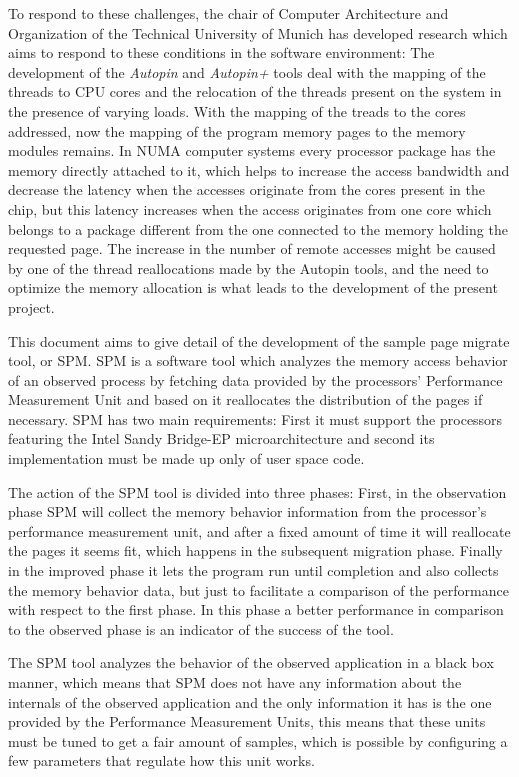 To respond to these challenges, the chair of Computer Architecture and Organization of the Technical University of Munich has developed research which aims to respond to these conditions in the software environment: The development of the \textit{Autopin} and \textit{Autopin+} tools deal with the mapping of the threads to CPU cores and the relocation of the threads present on the system in the presence of varying loads. 
With the mapping of the treads to the cores addressed, now the mapping of the program memory pages to the memory modules remains. In NUMA computer systems every processor package has the memory directly attached to it, which helps to increase the access bandwidth and decrease the latency when the accesses originate from the cores present in the chip, but this latency increases when the access originates from one core which belongs to a package different from the one connected to the memory holding the requested page.  The increase in the number of remote accesses might be caused by one of the thread reallocations made by the Autopin tools, and the need to optimize the memory allocation is what leads to the development of the present project.

This document aims to give detail of the development of the sample page migrate tool, or SPM. SPM is a software tool which analyzes the memory access behavior of an observed process by fetching data provided by the processors’ Performance Measurement Unit and based on it reallocates the distribution of the pages if necessary. SPM has two main requirements: First it must support the processors featuring the Intel Sandy Bridge-EP microarchitecture and second its implementation must be made up only of user space code.

The action of the SPM tool is divided into three phases: First, in the observation phase SPM will collect the memory behavior information from the processor’s performance measurement unit, and after a fixed amount of time it will reallocate the pages it seems fit, which happens in the subsequent migration phase. Finally in the improved phase it lets the program run until completion and also collects the memory behavior data, but just to facilitate a comparison of the performance with respect to the first phase. In this phase a better performance in comparison to the observed phase is an indicator of the success of the tool.

The SPM tool analyzes the behavior of the observed application in a black box manner, which means that SPM does not have any information about the internals of the observed application and the only information it has is the one provided by the Performance Measurement Units, this means that these units must be tuned to get a fair amount of samples, which is possible by configuring a few parameters that regulate how this unit works.

